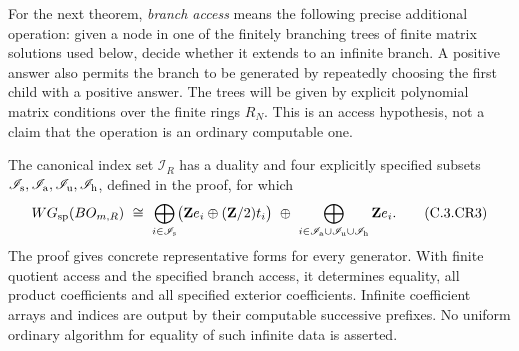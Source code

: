 For the next theorem, \emph{branch access} means the
following precise additional operation: given a node
in one of the finitely branching trees of finite
matrix solutions used below, decide whether it
extends to an infinite branch. A positive answer
also permits the branch to be generated by repeatedly
choosing the first child with a positive answer.
The trees will be given by explicit polynomial
matrix conditions over the finite rings $R_N$.
This is an access hypothesis, not a claim that
the operation is an ordinary computable one.

\begin{theorem}
\label{C:complete-finite-WG}
The canonical index set $\mathscr I_R$ has a duality
and four explicitly specified subsets
$\mathscr I_{\rm s},\mathscr I_{\rm a},
\mathscr I_{\rm u},\mathscr I_{\rm h}$, defined in the
proof, for which
\[
 WG_{\rm sp}(BO_{m,R})\ \cong\
 \bigoplus_{i\in\mathscr I_{\rm s}}
       \bigl(\mathbf Z e_i\oplus(\mathbf Z/2)t_i\bigr)
 \ \oplus\
 \bigoplus_{i\in\mathscr I_{\rm a}\cup\mathscr I_{\rm u}
                         \cup\mathscr I_{\rm h}}
       \mathbf Z e_i.                                  \tag{C.3.CR3}
\]
The proof gives concrete representative forms for
every generator. With finite quotient access and
the specified branch access, it determines equality,
all product coefficients and all specified exterior
coefficients. Infinite coefficient arrays and indices
are output by their computable successive prefixes.
No uniform ordinary algorithm for equality of such
infinite data is asserted.
\end{theorem}
